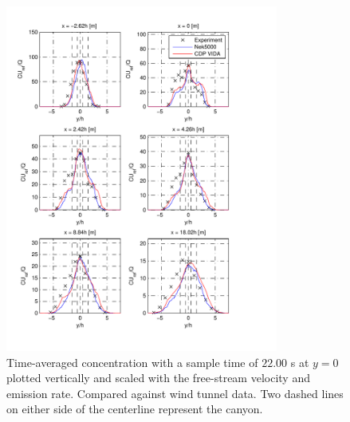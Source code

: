 \begin{figure}[h]
	\centering
	\includegraphics[width=0.8\textwidth]{Figures/Nek_smag_cH.pdf}
	\caption{Time-averaged concentration with a sample time of $22.00$ s at $y = 0$ plotted
    vertically and scaled 
	with the free-stream velocity and emission rate. Compared against wind tunnel data.
Two dashed lines on either side of the centerline represent the canyon.}
	\label{fig:cVsmag}
\end{figure}
%
%
